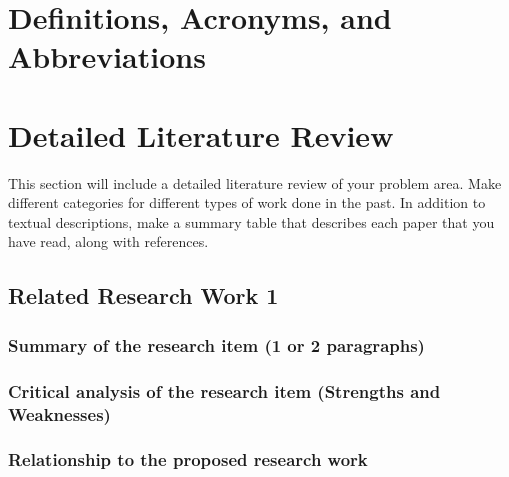 \documentclass{FastFyp}
\begin{document}
\section{Definitions, Acronyms, and Abbreviations}
\section{Detailed Literature Review} 
This section will include a detailed literature review of your problem area. Make different categories for different types of work done in the past.  In addition to textual descriptions, make a summary table that describes each paper that you have read, along with references.
\subsection{Related Research Work 1}
\subsubsection{Summary of the research item (1 or 2 paragraphs)}
\subsubsection{Critical analysis of the research item (Strengths and Weaknesses)}
\subsubsection{Relationship to the proposed research work}
\end{document}
